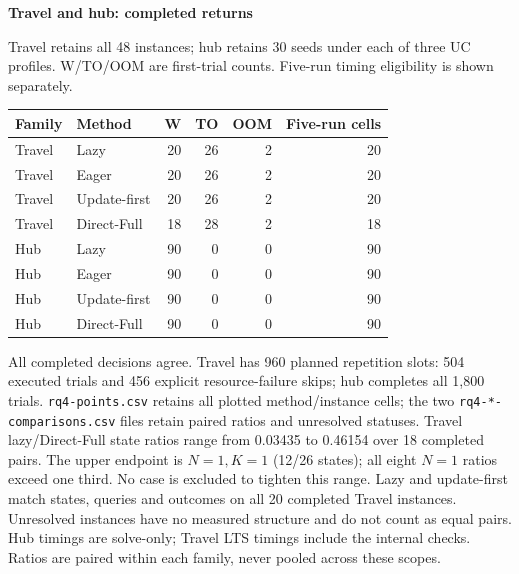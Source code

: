 \clearpage\noindent\textbf{Travel and hub: completed returns}\par
Travel retains all 48 instances; hub retains 30 seeds under each of three UC profiles.
W/TO/OOM are first-trial counts. Five-run timing eligibility is shown separately.
\begin{center}\small\begin{tabular}{@{}llrrrr@{}}\toprule
Family & Method & W & TO & OOM & Five-run cells\\\midrule
Travel & Lazy & 20 & 26 & 2 & 20\\
Travel & Eager & 20 & 26 & 2 & 20\\
Travel & Update-first & 20 & 26 & 2 & 20\\
Travel & Direct-Full & 18 & 28 & 2 & 18\\
Hub & Lazy & 90 & 0 & 0 & 90\\
Hub & Eager & 90 & 0 & 0 & 90\\
Hub & Update-first & 90 & 0 & 0 & 90\\
Hub & Direct-Full & 90 & 0 & 0 & 90\\
\bottomrule\end{tabular}\end{center}
All completed decisions agree. Travel has 960 planned repetition slots: 504 executed trials and 456 explicit resource-failure skips; hub completes all 1,800 trials.
\texttt{rq4-points.csv} retains all plotted method/instance cells; the two \texttt{rq4-*-comparisons.csv} files retain paired ratios and unresolved statuses.
Travel lazy/Direct-Full state ratios range from 0.03435 to 0.46154 over 18 completed pairs. The upper endpoint is $N=1,K=1$ (12/26 states); all eight $N=1$ ratios exceed one third. No case is excluded to tighten this range.
Lazy and update-first match states, queries and outcomes on all 20 completed Travel instances. Unresolved instances have no measured structure and do not count as equal pairs.
Hub timings are solve-only; Travel LTS timings include the internal checks. Ratios are paired within each family, never pooled across these scopes.
